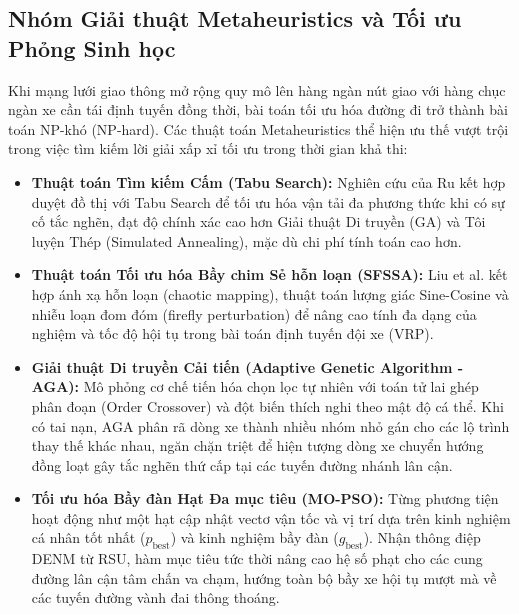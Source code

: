 \documentclass[a4paper]{article}
\begin{document}
\subsection{Nhóm Giải thuật Metaheuristics và Tối ưu Phỏng Sinh học}
Khi mạng lưới giao thông mở rộng quy mô lên hàng ngàn nút giao với hàng chục ngàn xe cần tái định tuyến đồng thời, bài toán tối ưu hóa đường đi trở thành bài toán NP-khó (NP-hard). Các thuật toán Metaheuristics thể hiện ưu thế vượt trội trong việc tìm kiếm lời giải xấp xỉ tối ưu trong thời gian khả thi:
\begin{itemize}
    \item \textbf{Thuật toán Tìm kiếm Cấm (Tabu Search):} Nghiên cứu của Ru kết hợp duyệt đồ thị với Tabu Search để tối ưu hóa vận tải đa phương thức khi có sự cố tắc nghẽn, đạt độ chính xác cao hơn Giải thuật Di truyền (GA) và Tôi luyện Thép (Simulated Annealing), mặc dù chi phí tính toán cao hơn.
    \item \textbf{Thuật toán Tối ưu hóa Bầy chim Sẻ hỗn loạn (SFSSA):} Liu et al. kết hợp ánh xạ hỗn loạn (chaotic mapping), thuật toán lượng giác Sine-Cosine và nhiễu loạn đom đóm (firefly perturbation) để nâng cao tính đa dạng của nghiệm và tốc độ hội tụ trong bài toán định tuyến đội xe (VRP).
    \item \textbf{Giải thuật Di truyền Cải tiến (Adaptive Genetic Algorithm - AGA):} Mô phỏng cơ chế tiến hóa chọn lọc tự nhiên với toán tử lai ghép phân đoạn (Order Crossover) và đột biến thích nghi theo mật độ cá thể. Khi có tai nạn, AGA phân rã dòng xe thành nhiều nhóm nhỏ gán cho các lộ trình thay thế khác nhau, ngăn chặn triệt để hiện tượng dòng xe chuyển hướng đồng loạt gây tắc nghẽn thứ cấp tại các tuyến đường nhánh lân cận.
    \item \textbf{Tối ưu hóa Bầy đàn Hạt Đa mục tiêu (MO-PSO):} Từng phương tiện hoạt động như một hạt cập nhật vectơ vận tốc và vị trí dựa trên kinh nghiệm cá nhân tốt nhất ($p_{\text{best}}$) và kinh nghiệm bầy đàn ($g_{\text{best}}$). Nhận thông điệp DENM từ RSU, hàm mục tiêu tức thời nâng cao hệ số phạt cho các cung đường lân cận tâm chấn va chạm, hướng toàn bộ bầy xe hội tụ mượt mà về các tuyến đường vành đai thông thoáng.
\end{itemize}
\end{document}
